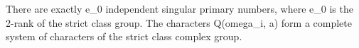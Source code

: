 There are exactly e_0 independent singular primary numbers, where e_0 is the 2-rank of the strict class group. The characters Q(omega_i, a) form a complete system of characters of the strict class complex group.
